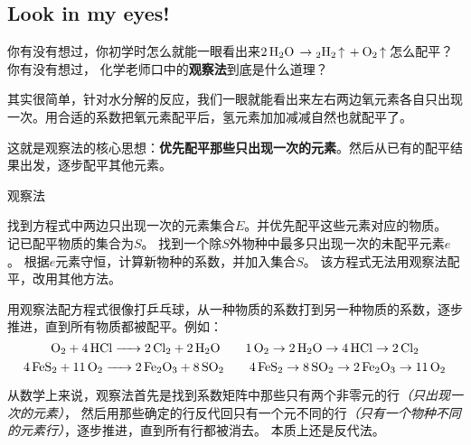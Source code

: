 \documentclass{ctexart}
\begin{document}
\subsection[Look in my eyes!]{Look in my
eyes!\supercite{BalancingChemicalEquations1997,SimplerMethodChemical1986}}

你有没有想过，你初学时怎么就能一眼看出来\(\ce{2H2O \to 2H2 ^ + O2 ^}\)怎么配平？你有没有想过，
化学老师口中的\textbf{观察法}到底是什么道理？

其实很简单，针对水分解的反应，我们一眼就能看出来左右两边氧元素各自只出现一次。用合适的系数把氧元素配平后，氢元素加加减减自然也就配平了。

这就是观察法的核心思想：\textbf{优先配平那些只出现一次的元素}。然后从已有的配平结果出发，逐步配平其他元素。

\begin{algorithm}[H]
    \caption{观察法}
    \label{alg:inspection}
    \begin{algorithmic}[1]
        \State 找到方程式中两边只出现一次的元素集合\(E\)。并优先配平这些元素对应的物质。
        \State 记已配平物质的集合为\(S\)。
        \State 找到一个除\(S\)外物种中最多只出现一次的未配平元素\(e\)。
        \State 根据\(e\)元素守恒，计算新物种的系数，并加入集合\(S\)。
        \Else
        \State 该方程式无法用观察法配平，改用其他方法。
        \EndIf
        \EndWhile
    \end{algorithmic}
\end{algorithm}

用观察法配方程式很像打乒乓球，从一种物质的系数打到另一种物质的系数，逐步推进，直到所有物质都被配平。例如：
\[
    \ce{O2 + 4 HCl -> 2 Cl2 + 2 H2O} \qquad \ce{1O2} \to \ce{2H2O} \to
    \ce{4HCl} \to \ce{2Cl2}
\]
\[
    \ce{4FeS2 + 11O2 -> 2Fe2O3 + 8SO2} \qquad \ce{4FeS2} \to \ce{8SO2} \to
    \ce{2Fe2O3} \to \ce{11O2}
\]

从数学上来说，观察法首先是找到系数矩阵中那些只有两个非零元的行\textit{（只出现一次的元素）}，
然后用那些确定的行反代回只有一个元不同的行\textit{（只有一个物种不同的元素行）}，逐步推进，直到所有行都被消去。
本质上还是反代法。
\end{document}
